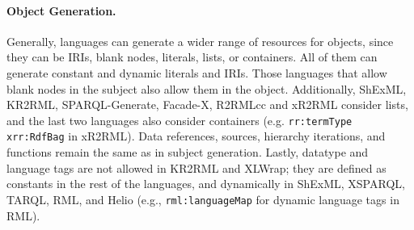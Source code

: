 \noindent\paragraph{\textbf{Object Generation.}} %
Generally, languages can generate a wider range of resources for objects, since they can be IRIs, blank nodes, literals, lists, or containers. All of them can generate constant and dynamic literals and IRIs. Those languages that allow blank nodes in the subject also allow them in the object. Additionally, ShExML, KR2RML, SPARQL-Generate, Facade-X, R2RMLcc and xR2RML consider lists, and the last two languages also consider containers (e.g. \texttt{rr:termType xrr:RdfBag} in xR2RML). Data references, sources, hierarchy iterations, and functions remain the same as in subject generation. Lastly, datatype and language tags are not allowed in KR2RML and XLWrap; they are defined as constants in the rest of the languages, and dynamically in ShExML, XSPARQL, TARQL, RML, and Helio (e.g., \texttt{rml:languageMap} for dynamic language tags in RML).

%







